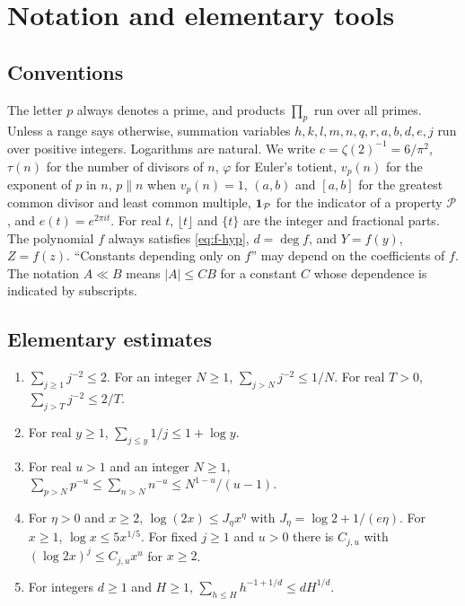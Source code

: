 \chapter{Notation and elementary tools}\label{ch:prelim}

\section{Conventions}

The letter $p$ always denotes a prime, and products $\prod_p$ run over all primes. Unless a range says otherwise, summation variables $h,k,l,m,n,q,r,a,b,d,e,j$ run over positive integers. Logarithms are natural. We write $c=\zeta(2)^{-1}=6/\pi^2$, $\tau(n)$ for the number of divisors of $n$, $\varphi$ for Euler's totient, $v_p(n)$ for the exponent of $p$ in $n$, $p\parallel n$ when $v_p(n)=1$, $(a,b)$ and $[a,b]$ for the greatest common divisor and least common multiple, $\mathbf 1_{\mathcal P}$ for the indicator of a property $\mathcal P$, and $e(t)=e^{2\pi it}$. For real $t$, $\lfloor t\rfloor$ and $\{t\}$ are the integer and fractional parts. The polynomial $f$ always satisfies \eqref{eq:f-hyp}, $d=\deg f$, and $Y=f(y)$, $Z=f(z)$. ``Constants depending only on $f$'' may depend on the coefficients of $f$. The notation $A\ll B$ means $|A|\le CB$ for a constant $C$ whose dependence is indicated by subscripts.

\section{Elementary estimates}

\begin{lemma}\label{lem:sums}
\begin{enumerate}[label=(\alph*)]
\item $\sum_{j\ge1}j^{-2}\le2$. For an integer $N\ge1$, $\sum_{j>N}j^{-2}\le1/N$. For real $T>0$, $\sum_{j>T}j^{-2}\le2/T$.
\item For real $y\ge1$, $\sum_{j\le y}1/j\le1+\log y$.
\item For real $u>1$ and an integer $N\ge1$, $\sum_{p>N}p^{-u}\le\sum_{n>N}n^{-u}\le N^{1-u}/(u-1)$.
\item For $\eta>0$ and $x\ge2$, $\log(2x)\le J_\eta x^\eta$ with $J_\eta=\log2+1/(e\eta)$. For $x\ge1$, $\log x\le5x^{1/5}$. For fixed $j\ge1$ and $u>0$ there is $C_{j,u}$ with $(\log 2x)^j\le C_{j,u}x^u$ for $x\ge2$.
\item For integers $d\ge1$ and $H\ge1$, $\sum_{h\le H}h^{-1+1/d}\le dH^{1/d}$.
\end{enumerate}
\end{lemma}

